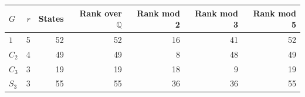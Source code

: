 \begin{tabular}{lrrrrrr}
\toprule
$G$ & $r$ & States & Rank over $\mathbb Q$ & Rank mod 2 & Rank mod 3 & Rank mod 5 \\
\midrule
$1$ & 5 & 52 & 52 & 16 & 41 & 52 \\
$C_2$ & 4 & 49 & 49 & 8 & 48 & 49 \\
$C_3$ & 3 & 19 & 19 & 18 & 9 & 19 \\
$S_3$ & 3 & 55 & 55 & 36 & 36 & 55 \\
\bottomrule
\end{tabular}
